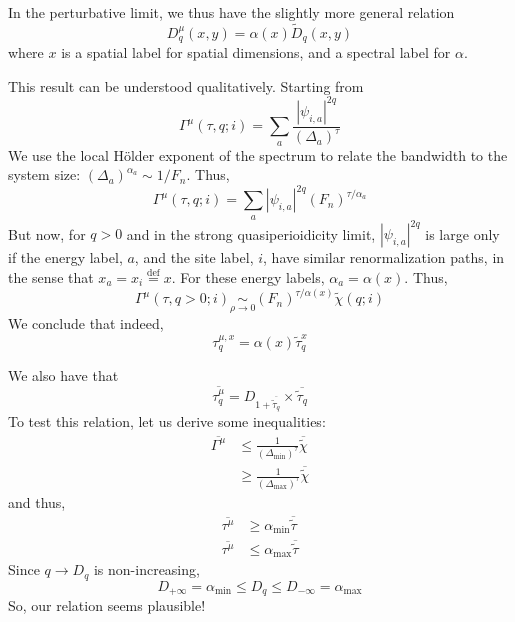 \documentclass[11pt]{article}
\newcommand{\define}{\ensuremath{ \overset{\text{def}}{=} }}
\newcommand{\simlim}[2]{\ensuremath{ \underset{#1 \rightarrow #2}{\sim} }}
\begin{document}
In the perturbative limit, we thus have the slightly more general relation
\begin{equation}
\boxed{
	D^\mu_q(x,y) = \alpha(x) \tilde{D}_q(x,y)
}
\end{equation}
where $x$ is a spatial label for spatial dimensions, and a spectral label for $\alpha$.

This result can be understood qualitatively. 
Starting from
\begin{equation}
	\Gamma^\mu(\tau,q;i) = \sum_a \frac{|\psi_{i,a}|^{2q}}{(\Delta_a)^\tau}
\end{equation}
We use the local Hölder exponent of the spectrum to relate the bandwidth to the system size: $(\Delta_a)^{\alpha_a} \sim 1/F_n$. Thus,
\begin{equation}
	\Gamma^\mu(\tau,q;i) = \sum_a|\psi_{i,a}|^{2q} (F_n)^{\tau/\alpha_a}
\end{equation}
But now, for $q > 0$ and in the strong quasiperioidicity limit, $|\psi_{i,a}|^{2q}$ is large only if the energy label, $a$, and the site label, $i$, have similar renormalization paths, in the sense that $x_a = x_i \define x$. For these energy labels, $\alpha_a = \alpha(x)$.
Thus,
\begin{equation}
	\Gamma^\mu(\tau,q>0;i) \simlim{\rho}{0} (F_n)^{\tau/\alpha(x)} \tilde \chi(q;i)
\end{equation}
We conclude that indeed,
\begin{equation}
	\tau^{\mu,x}_q = \alpha(x) \tilde{\tau}^x_q
\end{equation}

We also have that
\begin{equation}
\boxed{
	\overline{\tau^\mu_q} = D_{1+\overline{\tilde{\tau}_q}}\times \overline{\tilde{\tau}_q} 
}
\end{equation}
To test this relation, let us derive some inequalities:
\begin{align}
	\overline{\Gamma^\mu} &\leq \frac{1}{(\Delta_{\text{min}})^\tau} \overline{\tilde{\chi}}\\
							&\geq \frac{1}{(\Delta_{\text{max}})^\tau} \overline{\tilde{\chi}}
\end{align}
and thus,
\begin{align}
	\overline{\tau^\mu} &\geq \alpha_\text{min} \overline{\tilde{\tau}} \\
	\overline{\tau^\mu} &\leq \alpha_\text{max} \overline{\tilde{\tau}}
\end{align}
Since $q \rightarrow D_q$ is non-increasing, 
\begin{equation}
	D_{+\infty} = \alpha_\text{min} \leq D_q \leq D_{-\infty} = \alpha_\text{max}
\end{equation}
So, our relation seems plausible!
\end{document}
